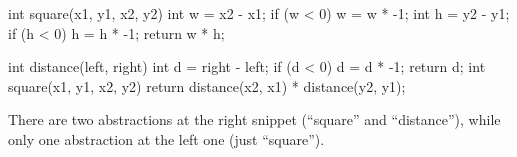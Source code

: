 \documentclass{article}
\begin{document}

\begin{pptWide}{2}
{\small\begin{ffcode}
int square(x1, y1, x2, y2) {
  int w = x2 - x1;
  if (w < 0) { w = w * -1; }
  int h = y2 - y1;
  if (h < 0) { h = h * -1; }
  return w * h;
}
\end{ffcode}
}
\par\columnbreak\par
{\small\begin{ffcode}
int distance(left, right) {
  int d = right - left;
  if (d < 0) { d = d * -1; }
  return d;
}
int square(x1, y1, x2, y2) {
  return distance(x2, x1)
    * distance(y2, y1);
}
\end{ffcode}
}
\end{pptWide}\par
There are two abstractions at the right snippet (``square'' and ``distance''), while only one abstraction at the left one (just ``square'').
\plush{}
\end{document}
